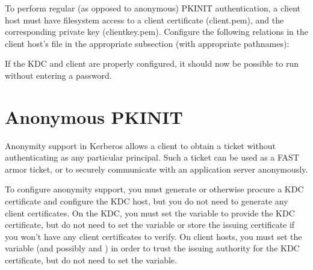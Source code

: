 \documentclass[letterpaper,10pt,english]{sphinxmanual}
\begin{document}
\sphinxAtStartPar
To perform regular (as opposed to anonymous) PKINIT authentication, a
client host must have filesystem access to a client certificate
(client.pem), and the corresponding private key (clientkey.pem).
Configure the following relations in the client host’s
{\hyperref[\detokenize{admin/conf_files/krb5_conf:krb5-conf-5}]{}} file in the appropriate {\hyperref[\detokenize{admin/conf_files/krb5_conf:realms}]{}} subsection
(with appropriate pathnames):

\begin{sphinxVerbatim}[commandchars=\\\{\}]
  
\end{sphinxVerbatim}

\sphinxAtStartPar
If the KDC and client are properly configured, it should now be
possible to run  without entering a password.


\section{Anonymous PKINIT}
\label{\detokenize{admin/pkinit:anonymous-pkinit}}\label{\detokenize{admin/pkinit:id1}}
\sphinxAtStartPar
Anonymity support in Kerberos allows a client to obtain a ticket
without authenticating as any particular principal.  Such a ticket can
be used as a FAST armor ticket, or to securely communicate with an
application server anonymously.

\sphinxAtStartPar
To configure anonymity support, you must generate or otherwise procure
a KDC certificate and configure the KDC host, but you do not need to
generate any client certificates.  On the KDC, you must set the
 variable to provide the KDC certificate, but do
not need to set the  variable or store the issuing
certificate if you won’t have any client certificates to verify.  On
client hosts, you must set the  variable (and
possibly  and ) in order
to trust the issuing authority for the KDC certificate, but do not
need to set the  variable.
\end{document}
